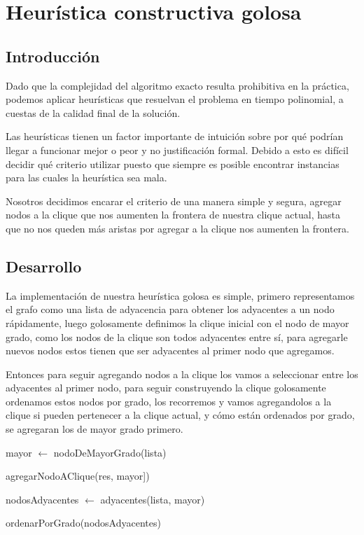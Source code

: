 \section{Heurística constructiva golosa}
\subsection{Introducción}
Dado que la complejidad del algoritmo exacto resulta prohibitiva en la práctica, podemos aplicar heurísticas que resuelvan el problema en tiempo polinomial, a cuestas de la calidad final de la solución.

Las heurísticas tienen un factor importante de intuición sobre por qué podrían llegar a funcionar mejor o peor y no justificación formal. Debido a esto es difícil decidir qué criterio utilizar puesto que siempre es posible encontrar instancias para las cuales la heurística sea mala.

Nosotros decidimos encarar el criterio de una manera simple y segura, agregar nodos a la clique que nos aumenten la frontera de nuestra clique actual, hasta que no nos queden más aristas por agregar a la clique nos aumenten la frontera.

\subsection{Desarrollo}
La implementación de nuestra heurística golosa es simple, primero representamos el grafo como una lista de adyacencia para obtener los adyacentes a un nodo rápidamente, luego golosamente definimos la clique inicial con el nodo de mayor grado, como los nodos de la clique son todos adyacentes entre sí, para agregarle nuevos nodos estos tienen que ser adyacentes al primer nodo que agregamos.

Entonces para seguir agregando nodos a la clique los vamos a seleccionar entre los adyacentes al primer nodo, para seguir construyendo la clique golosamente ordenamos estos nodos por grado, los recorremos y vamos agregandolos a la clique si pueden pertenecer a la clique actual, y cómo están ordenados por grado, se agregaran los de mayor grado primero.

\begin{algorithm}[H]
	\NoCaptionOfAlgo
	\caption{}

    mayor $\leftarrow$ nodoDeMayorGrado(lista)

    agregarNodoAClique(res, mayor])

    nodosAdyacentes $\leftarrow$ adyacentes(lista, mayor)

    ordenarPorGrado(nodosAdyacentes)

\end{algorithm}

